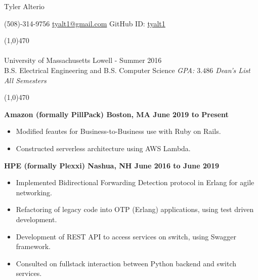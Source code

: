 \documentclass[11pt, a4paper]{article} %
\newcommand{\tinybullet}{ {\tiny \textbullet} }
\begin{document}
\centerline{\Huge \sc Tyler Alterio}

\centerline{
(508)-314-9756 \tinybullet \hspace{1pt}
\href{mailto:tyalt1@gmail.com}{tyalt1@gmail.com} \tinybullet \hspace{1pt}
GitHub ID: \href{http://www.github.com/tyalt1}{tyalt1}
}

\noindent \line(1,0){470}\\

\smallskip \\
University of Massachusetts Lowell - Summer 2016 \\
B.S. Electrical Engineering and B.S. Computer Science
\hfill {\it GPA: $3.486$ \tinybullet \hspace{1pt} Dean's List All Semesters}

\noindent \line(1,0){470}\\

\vspace{5pt}

\centerline{\bf Amazon (formally PillPack) \tinybullet \hspace{1pt} Boston, MA \hfill June 2019 to Present}
\begin{itemize}
\itemsep0em
	\item Modified feautes for Business-to-Business use with Ruby on Rails.
	\item Constructed serverless architecture using AWS Lambda.
\end{itemize}

\centerline{\bf HPE (formally Plexxi) \tinybullet \hspace{1pt} Nashua, NH \hfill June 2016 to June 2019}
\begin{itemize}
\itemsep0em
	\item Implemented Bidirectional Forwarding Detection protocol in Erlang for agile networking.
	\item Refactoring of legacy code into OTP (Erlang) applications, using test driven development.
	\item Development of REST API to access services on switch, using Swagger framework.
	\item Consulted on fullstack interaction between Python backend and switch services.
\end{itemize}
\end{document}

